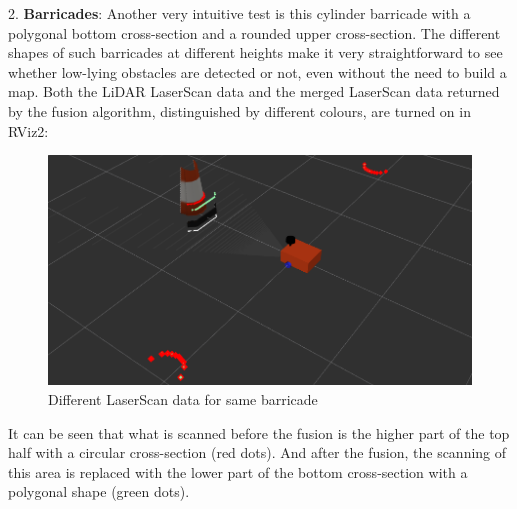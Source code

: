 2. \textbf{Barricades}: Another very intuitive test is this cylinder barricade 
with a polygonal bottom cross-section and a rounded upper cross-section.
The different shapes of such barricades at different heights make it very straightforward 
to see whether low-lying obstacles are detected or not, 
even without the need to build a map. 
Both the LiDAR LaserScan data and the merged LaserScan data returned by the fusion algorithm, 
distinguished by different colours, are turned on in RViz2:
\begin{figure}[H]
    \centering
    \includegraphics[width=0.8\linewidth]{figs/barricade.png}
    \caption{Different LaserScan data for same barricade}
\end{figure}
It can be seen that what is scanned before the fusion 
is the higher part of the top half with a circular cross-section (red dots).
And after the fusion, the scanning of this area is replaced with the lower part of the bottom cross-section 
with a polygonal shape (green dots).




